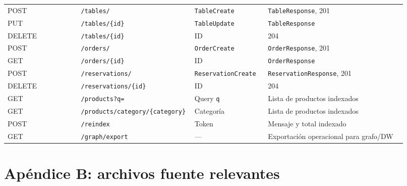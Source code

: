 \documentclass[12pt,letterpaper]{article}
\def\codefile#1{\nolinkurl{#1}}
\begin{document}
\begin{longtable}{p{0.18\linewidth}p{0.22\linewidth}p{0.18\linewidth}p{0.34\linewidth}}
POST & \codefile{/tables/} & \codefile{TableCreate} & \codefile{TableResponse}, 201\\
PUT & \codefile{/tables/{id}} & \codefile{TableUpdate} & \codefile{TableResponse}\\
DELETE & \codefile{/tables/{id}} & ID & 204\\
POST & \codefile{/orders/} & \codefile{OrderCreate} & \codefile{OrderResponse}, 201\\
GET & \codefile{/orders/{id}} & ID & \codefile{OrderResponse}\\
POST & \codefile{/reservations/} & \codefile{ReservationCreate} & \codefile{ReservationResponse}, 201\\
DELETE & \codefile{/reservations/{id}} & ID & 204\\
GET & \codefile{/products?q=} & Query \codefile{q} & Lista de productos indexados\\
GET & \codefile{/products/category/{category}} & Categoría & Lista de productos indexados\\
POST & \codefile{/reindex} & Token & Mensaje y total indexado\\
GET & \codefile{/graph/export} & --- & Exportación operacional para grafo/DW\\
\bottomrule
\end{longtable}

\section{Apéndice B: archivos fuente relevantes}
\end{document}
